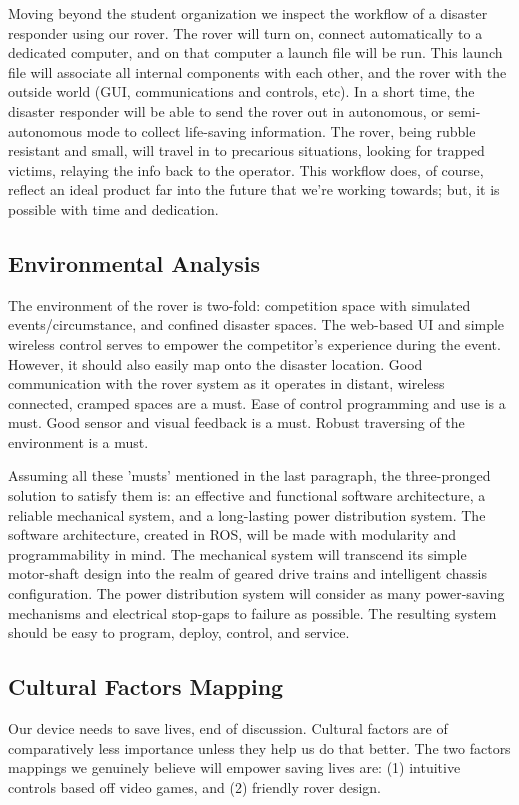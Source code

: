 \documentclass[a4paper, 10pt]{article}
\begin{document}
	Moving beyond the student organization we inspect the workflow of a disaster responder using our rover. The rover will turn on, connect automatically to a dedicated computer, and on that computer a launch file will be run. This launch file will associate all internal components with each other, and the rover with the outside world (GUI, communications and controls, etc). In a short time, the disaster responder will be able to send the rover out in autonomous, or semi-autonomous mode to collect life-saving information. The rover, being rubble resistant and small, will travel in to precarious situations, looking for trapped victims, relaying the info back to the operator. This workflow does, of course, reflect an ideal product far into the future that we're working towards; but, it is possible with time and dedication. 

	\subsection{Environmental Analysis}
	The environment of the rover is two-fold: competition space with simulated events/circumstance, and confined disaster spaces. The web-based UI and simple wireless control serves to empower the competitor's experience during the event. However, it should also easily map onto the disaster location. Good communication with the rover system as it operates in distant, wireless connected, cramped spaces are a must. Ease of control programming and use is a must. Good sensor and visual feedback is a must. Robust traversing of the environment is a must. 
	
	Assuming all these 'musts' mentioned in the last paragraph, the three-pronged solution to satisfy them is: an effective and functional software architecture, a reliable mechanical system, and a long-lasting power distribution system. The software architecture, created in ROS, will be made with modularity and programmability in mind. The mechanical system will transcend its simple motor-shaft design into the realm of geared drive trains and intelligent chassis configuration. The power distribution system will consider as many power-saving mechanisms and electrical stop-gaps to failure as possible. The resulting system should be easy to program, deploy, control, and service.

	\subsection{Cultural Factors Mapping}
	Our device needs to save lives, end of discussion. Cultural factors are of comparatively less importance unless they help us do that better. The two factors mappings we genuinely believe will empower saving lives are: (1) intuitive controls based off video games, and (2) friendly rover design.
	
\end{document}
